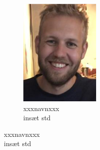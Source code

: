 \begin{titlepage}
\begin{figure}[b!]
\begin{subfigure}[1]{0.20\linewidth}
    \includegraphics[width=\linewidth]{Overleaf/Pictures/Frontpage/Nikolaj.png}
    \captionsetup{justification=centering}
    \caption[]{{\small xxxnavnxxx}\\{insæt std}}
    \end{subfigure}
    \hspace{2em}
    \vspace{20mm}
\end{figure}
\end{titlepage}